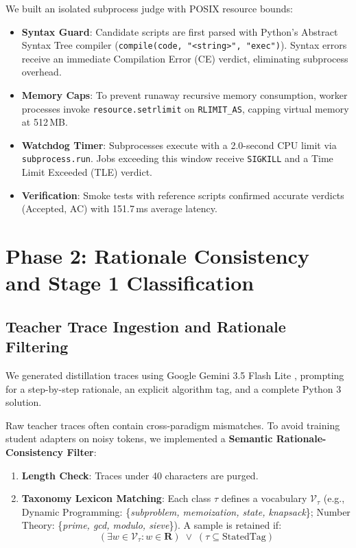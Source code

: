 \documentclass[journal]{IEEEtran}
\begin{document}
We built an isolated subprocess judge with POSIX resource bounds:
\begin{itemize}
    \item \textbf{Syntax Guard}: Candidate scripts are first parsed with Python's Abstract Syntax Tree compiler (\texttt{compile(code, "<string>", "exec")}). Syntax errors receive an immediate Compilation Error (CE) verdict, eliminating subprocess overhead.
    \item \textbf{Memory Caps}: To prevent runaway recursive memory consumption, worker processes invoke \texttt{resource.setrlimit} on \texttt{RLIMIT\_AS}, capping virtual memory at 512\,MB.
    \item \textbf{Watchdog Timer}: Subprocesses execute with a 2.0-second CPU limit via \texttt{subprocess.run}. Jobs exceeding this window receive \texttt{SIGKILL} and a Time Limit Exceeded (TLE) verdict.
    \item \textbf{Verification}: Smoke tests with reference scripts confirmed accurate verdicts (Accepted, AC) with 151.7\,ms average latency.
\end{itemize}

\section{Phase 2: Rationale Consistency and Stage 1 Classification}
\subsection{Teacher Trace Ingestion and Rationale Filtering}
We generated distillation traces using Google Gemini 3.5 Flash Lite \cite{gemini2024flash}, prompting for a step-by-step rationale, an explicit algorithm tag, and a complete Python 3 solution.

Raw teacher traces often contain cross-paradigm mismatches. To avoid training student adapters on noisy tokens, we implemented a \textbf{Semantic Rationale-Consistency Filter}:
\begin{enumerate}
    \item \textbf{Length Check}: Traces under 40 characters are purged.
    \item \textbf{Taxonomy Lexicon Matching}: Each class $\tau$ defines a vocabulary $\mathcal{V}_\tau$ (e.g., Dynamic Programming: \{\textit{subproblem, memoization, state, knapsack}\}; Number Theory: \{\textit{prime, gcd, modulo, sieve}\}). A sample is retained if:
    \begin{equation}
    \left(\exists w \in \mathcal{V}_\tau : w \in \mathbf{R}\right) \;\lor\; \left(\tau \subseteq \text{StatedTag}\right)
    \end{equation}
\end{enumerate}
\end{document}
